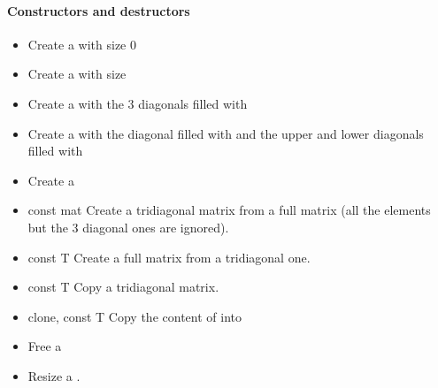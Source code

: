 \paragraph{Constructors and destructors}
\begin{itemize}
  \item {}
    \sshortdescribe Create a \PnlTridiagMat with size 0
  \item {}
    \sshortdescribe Create a \PnlTridiagMat with size 
  \item {}
    \sshortdescribe Create a \PnlTridiagMat with the 3 diagonals
    filled with 
  \item {}
    \sshortdescribe Create a \PnlTridiagMat  with the diagonal
    filled with  and the upper and lower diagonals filled with 
  \item {}
    \sshortdescribe Create a \PnlTridiagMat  
  \item {}
    {const \PnlMat \ptr mat}
    \sshortdescribe Create a tridiagonal matrix from a full matrix (all the
    elements but the 3 diagonal ones are ignored).
  \item {}
    {const \PnlTridiagMat \ptr T}
    \sshortdescribe Create a full matrix from a tridiagonal one.
  \item {}
    {const \PnlTridiagMat \ptr T}
    \sshortdescribe Copy a tridiagonal matrix.
  \item {}
    {\PnlTridiagMat \ptr clone, const \PnlTridiagMat \ptr T}
    \sshortdescribe Copy the content of  into 
  \item {}
    \sshortdescribe Free a \PnlTridiagMat  
  \item {}
    \sshortdescribe Resize a \PnlTridiagMat.  
\end{itemize}


